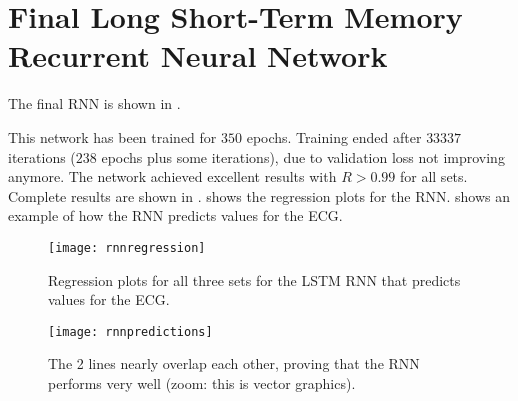 \section{Final Long Short-Term Memory Recurrent Neural
Network}\label{sec:rnnfinalrnn}

The final RNN is shown in .



This network has been trained for \(350\) epochs. Training ended after
\(33337\) iterations (\(238\) epochs plus some iterations), due to validation
loss not improving anymore. The network achieved excellent results with \(R >
0.99\) for all sets. Complete results are shown in .
 shows the regression plots for the RNN.
 shows an example of how the RNN predicts values for
the ECG.



\begin{figure}[htbp]
	\centering
	\texttt{[image: rnnregression]}
	\caption{Regression plots for all three sets for the LSTM RNN
	that predicts values for the ECG.}\label{fig:rnnregression}
\end{figure}

\begin{figure}[htbp]
	\centering
	\texttt{[image: rnnpredictions]}
	\caption{The 2 lines nearly overlap each other, proving that the RNN
	performs very well (zoom: this is vector
	graphics).}\label{fig:rnnpredictions}
\end{figure}

